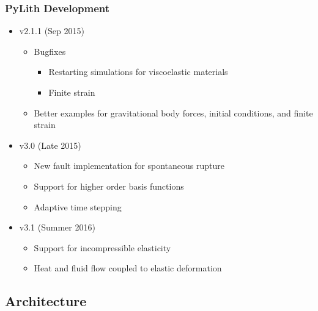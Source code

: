 \documentclass{beamer}
\begin{document}
\begin{frame}
  \frametitle{PyLith Development}
  
  \begin{itemize}
  \item v2.1.1 (Sep 2015)
    \begin{itemize}
    \item Bugfixes
      \begin{itemize}
      \item Restarting simulations for viscoelastic materials
      \item Finite strain
      \end{itemize}
    \item Better examples for gravitational body forces, initial
      conditions, and finite strain
    \end{itemize}
  \item v3.0 (Late 2015)
    \begin{itemize}
    \item New fault implementation for spontaneous rupture
    \item Support for higher order basis functions
    \item Adaptive time stepping
    \end{itemize}
  \item v3.1 (Summer 2016)
    \begin{itemize}
    \item Support for incompressible elasticity
    \item Heat and fluid flow coupled to elastic deformation
    \end{itemize}
  \end{itemize}

\end{frame}


\subsection{Architecture}
\end{document}
